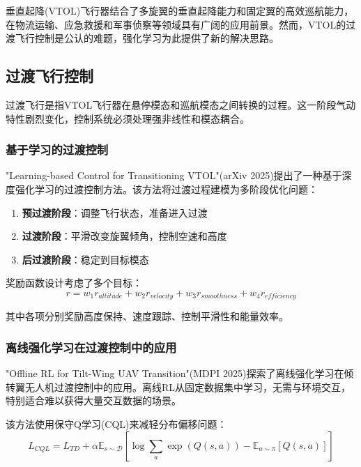 \documentclass[12pt,a4paper]{ctexart}
\begin{document}
垂直起降(VTOL)飞行器结合了多旋翼的垂直起降能力和固定翼的高效巡航能力，在物流运输、应急救援和军事侦察等领域具有广阔的应用前景。然而，VTOL的过渡飞行控制是公认的难题，强化学习为此提供了新的解决思路。

\subsection{过渡飞行控制}

过渡飞行是指VTOL飞行器在悬停模态和巡航模态之间转换的过程。这一阶段气动特性剧烈变化，控制系统必须处理强非线性和模态耦合。

\subsubsection{基于学习的过渡控制}

"Learning-based Control for Transitioning VTOL"(arXiv 2025)提出了一种基于深度强化学习的过渡控制方法。该方法将过渡过程建模为多阶段优化问题：

\begin{enumerate}
    \item \textbf{预过渡阶段}：调整飞行状态，准备进入过渡
    \item \textbf{过渡阶段}：平滑改变旋翼倾角，控制空速和高度
    \item \textbf{后过渡阶段}：稳定到目标模态
\end{enumerate}

奖励函数设计考虑了多个目标：
\begin{equation}
    r = w_1 r_{altitude} + w_2 r_{velocity} + w_3 r_{smoothness} + w_4 r_{efficiency}
\end{equation}

其中各项分别奖励高度保持、速度跟踪、控制平滑性和能量效率。

\subsubsection{离线强化学习在过渡控制中的应用}

"Offline RL for Tilt-Wing UAV Transition"(MDPI 2025)探索了离线强化学习在倾转翼无人机过渡控制中的应用。离线RL从固定数据集中学习，无需与环境交互，特别适合难以获得大量交互数据的场景。

该方法使用保守Q学习(CQL)来减轻分布偏移问题：
\begin{equation}
    L_{CQL} = L_{TD} + \alpha \mathbb{E}_{s \sim \mathcal{D}}[\log \sum_a \exp(Q(s,a)) - \mathbb{E}_{a \sim \pi}[Q(s,a)]]
\end{equation}
\end{document}
